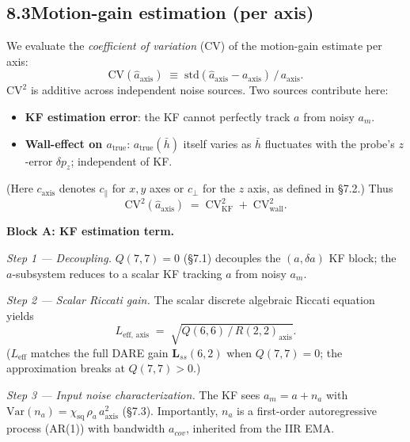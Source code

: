 \documentclass[11pt]{article}
\begin{document}
\subsection*{8.3\quad Motion-gain estimation (per axis)}

\noindent We evaluate the \emph{coefficient of variation} (CV) of the motion-gain estimate per axis:
\begin{equation}
\mathrm{CV}(\hat a_\mathrm{axis}) \;\equiv\; \mathrm{std}(\hat a_\mathrm{axis} - a_\mathrm{axis}) \,/\, a_\mathrm{axis}.
\end{equation}
$\mathrm{CV}^2$ is additive across independent noise sources. Two sources contribute here:
\begin{itemize}
\item \textbf{KF estimation error}: the KF cannot perfectly track $a$ from noisy $a_m$.
\item \textbf{Wall-effect on $a_\mathrm{true}$}: $a_\mathrm{true}(\bar h)$ itself varies as $\bar h$ fluctuates with the probe's $z$-error $\delta p_z$; independent of KF.
\end{itemize}
\noindent (Here $c_\mathrm{axis}$ denotes $c_\parallel$ for $x, y$ axes or $c_\perp$ for the $z$ axis, as defined in \S7.2.)
Thus
\begin{equation}
\mathrm{CV}^2(\hat a_\mathrm{axis}) \;=\; \mathrm{CV}^2_\mathrm{KF} \;+\; \mathrm{CV}^2_\mathrm{wall}.
\end{equation}

\bigskip
\noindent\textbf{Block A: KF estimation term.}

\smallskip
\noindent \textit{Step 1 --- Decoupling.} $Q(7,7) = 0$ (\S7.1) decouples the $(a, \delta a)$ KF block; the $a$-subsystem reduces to a scalar KF tracking $a$ from noisy $a_m$.

\smallskip
\noindent \textit{Step 2 --- Scalar Riccati gain.} The scalar discrete algebraic Riccati equation yields
\begin{equation}
L_\mathrm{eff,\,axis} \;=\; \sqrt{Q(6,6) \,/\, R(2,2)_\mathrm{axis}}.
\end{equation}
($L_\mathrm{eff}$ matches the full DARE gain $\bm{L}_{ss}(6,2)$ when $Q(7,7) = 0$; the approximation breaks at $Q(7,7) > 0$.)

\smallskip
\noindent \textit{Step 3 --- Input noise characterization.} The KF sees $a_m = a + n_a$ with $\mathrm{Var}(n_a) = \chi_\mathrm{sq}\,\rho_a\,a_\mathrm{axis}^2$ (\S7.3). Importantly, $n_a$ is a first-order autoregressive process (AR(1)) with bandwidth $a_{cov}$, inherited from the IIR EMA.
\end{document}
